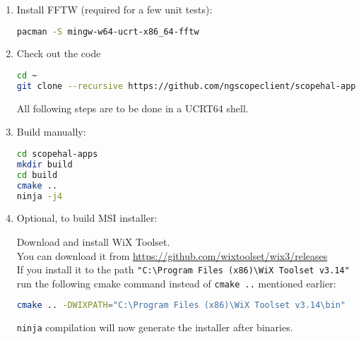 \begin{enumerate}
\item Install FFTW (required for a few unit tests):
\begin{lstlisting}[language=sh, numbers=none]
pacman -S mingw-w64-ucrt-x86_64-fftw
\end{lstlisting}

\item Check out the code

\begin{lstlisting}[language=sh, numbers=none]
cd ~
git clone --recursive https://github.com/ngscopeclient/scopehal-apps
\end{lstlisting}

All following steps are to be done in a UCRT64 shell.

\item Build manually:
\begin{lstlisting}[language=sh, numbers=none]
cd scopehal-apps
mkdir build
cd build
cmake ..
ninja -j4
\end{lstlisting}

\item Optional, to build MSI installer:

Download and install WiX Toolset.\\
You can download it from \href{https://github.com/wixtoolset/wix3/releases}{https://github.com/wixtoolset/wix3/releases}\\
If you install it to the path \texttt{"C:\textbackslash Program Files (x86)\textbackslash WiX Toolset v3.14"} run the following cmake command instead of \texttt{cmake ..} mentioned earlier:

\begin{lstlisting}[language=sh, numbers=none]
cmake .. -DWIXPATH="C:\Program Files (x86)\WiX Toolset v3.14\bin"
\end{lstlisting}

\texttt{ninja} compilation will now generate the installer after binaries.






\end{enumerate}
